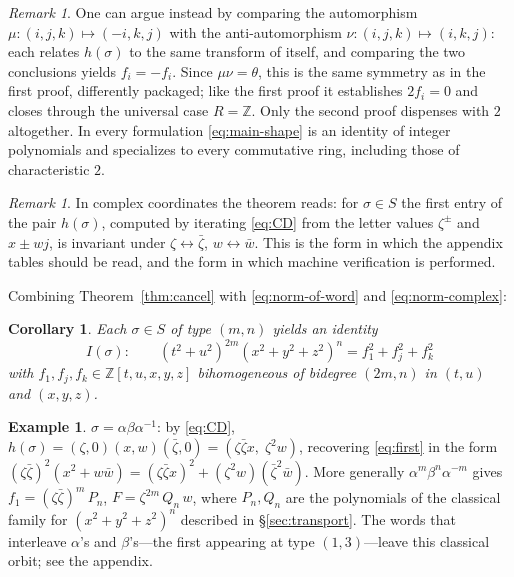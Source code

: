 \documentclass[11pt]{article}
\newtheorem{corollary}[theorem]{Corollary}
\theoremstyle{definition}
\newtheorem{example}[theorem]{Example}
\theoremstyle{remark}
\newtheorem{remark}[theorem]{Remark}
\newcommand{\ZZ}{\mathbb{Z}}
\newcommand{\bz}{\bar{\zeta}}
\newcommand{\bw}{\bar{w}}
\begin{document}
\begin{remark}\label{rem:mu-nu}
One can argue instead by comparing the automorphism $\mu\colon(i,j,k)\mapsto(-i,k,j)$ with the anti-automorphism $\nu\colon(i,j,k)\mapsto(i,k,j)$: each relates $h(\sigma)$ to the same transform of itself, and comparing the two conclusions yields $f_i=-f_i$. Since $\mu\nu=\theta$, this is the same symmetry as in the first proof, differently packaged; like the first proof it establishes $2f_i=0$ and closes through the universal case $R=\ZZ$. Only the second proof dispenses with $2$ altogether. In every formulation \eqref{eq:main-shape} is an identity of integer polynomials and specializes to every commutative ring, including those of characteristic $2$.
\end{remark}

\begin{remark}
In complex coordinates the theorem reads: for $\sigma\in S$ the first entry of the pair $h(\sigma)$, computed by iterating \eqref{eq:CD} from the letter values $\zeta^{\pm}$ and $x\pm wj$, is invariant under $\zeta\leftrightarrow\bz$, $w\leftrightarrow\bw$. This is the form in which the appendix tables should be read, and the form in which machine verification is performed.
\end{remark}

Combining Theorem~\ref{thm:cancel} with \eqref{eq:norm-of-word} and \eqref{eq:norm-complex}:

\begin{corollary}\label{cor:identity}
Each $\sigma\in S$ of type $(m,n)$ yields an identity
\[
I(\sigma):\qquad (t^2+u^2)^{2m}(x^2+y^2+z^2)^{n}=f_1^2+f_j^2+f_k^2
\]
with $f_1,f_j,f_k\in\ZZ[t,u,x,y,z]$ bihomogeneous of bidegree $(2m,n)$ in $(t,u)$ and $(x,y,z)$.
\end{corollary}

\begin{example}
$\sigma=\alpha\beta\alpha^{-1}$: by \eqref{eq:CD}, $h(\sigma)=(\zeta,0)(x,w)(\bz,0)=(\zeta\bz x,\;\zeta^2w)$, recovering \eqref{eq:first} in the form $(\zeta\bz)^2(x^2+w\bw)=(\zeta\bz x)^2+(\zeta^2w)(\bz^2\bw)$. More generally $\alpha^m\beta^n\alpha^{-m}$ gives $f_1=(\zeta\bz)^m\,P_n$, $F=\zeta^{2m}\,Q_n\,w$, where $P_n,Q_n$ are the polynomials of the classical family for $(x^2+y^2+z^2)^n$ described in \S\ref{sec:transport}. The words that interleave $\alpha$'s and $\beta$'s---the first appearing at type $(1,3)$---leave this classical orbit; see the appendix.
\end{example}
\end{document}
